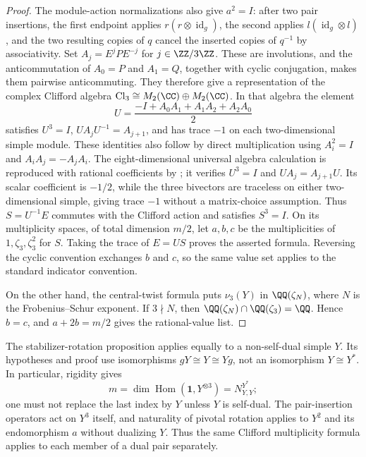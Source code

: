 \begin{proof}
The module-action normalizations also give $a^2=I$: after two pair
insertions, the first endpoint applies $r(r\otimes\operatorname{id}_g)$,
the second applies $l(\operatorname{id}_g\otimes l)$, and the two
resulting copies of $q$ cancel the inserted copies of $q^{-1}$ by
associativity. Set
$A_j=E^jPE^{-j}$ for $j\in\ZZ/3\ZZ$. These are involutions, and the
anticommutation of $A_0=P$ and $A_1=Q$, together with cyclic conjugation,
makes them pairwise anticommuting. They therefore give a representation
of the complex Clifford algebra $\mathrm{Cl}_3\cong M_2(\CC)\oplus
M_2(\CC)$. In that algebra the element
\[
 U=\frac{-I+A_0A_1+A_1A_2+A_2A_0}{2}
\]
satisfies $U^3=I$, $UA_jU^{-1}=A_{j+1}$, and has trace $-1$ on each
two-dimensional simple module. These identities also follow by direct
multiplication using $A_i^2=I$ and $A_iA_j=-A_jA_i$.
The eight-dimensional universal algebra calculation is reproduced with
rational coefficients by
; it verifies
$U^3=I$ and $UA_j=A_{j+1}U$. Its scalar coefficient is $-1/2$, while
the three bivectors are traceless on either two-dimensional simple,
giving trace $-1$ without a matrix-choice assumption.
Thus $S=U^{-1}E$ commutes with the Clifford action and satisfies
$S^3=I$. On its multiplicity spaces, of total dimension $m/2$, let
$a,b,c$ be the multiplicities of $1,\zeta_3,\zeta_3^2$ for $S$.
Taking the trace of $E=US$ proves the asserted formula. Reversing the
cyclic convention exchanges $b$ and $c$, so the same value set applies
to the standard indicator convention.

On the other hand, the central-twist
formula puts $\nu_3(Y)$ in $\QQ(\zeta_N)$, where $N$ is the
Frobenius--Schur exponent. If $3\nmid N$, then
$\QQ(\zeta_N)\cap\QQ(\zeta_3)=\QQ$. Hence $b=c$, and
$a+2b=m/2$ gives the rational-value list.
\end{proof}

\begin{remark}
The stabilizer-rotation proposition applies equally to a non-self-dual
simple $Y$. Its hypotheses and proof use isomorphisms $gY\cong Y\cong Yg$,
not an isomorphism $Y\cong Y^*$. In particular, rigidity gives
\[
 m=\dim\operatorname{Hom}(\mathbf1,Y^{\otimes3})=N_{Y,Y}^{Y^*};
\]
one must not replace the last index by $Y$ unless $Y$ is self-dual.
The pair-insertion operators act on $Y^3$ itself, and naturality of pivotal
rotation applies to $Y^2$ and its endomorphism $a$ without dualizing $Y$.
Thus the same Clifford multiplicity formula applies to each member of a
dual pair separately.
\end{remark}

